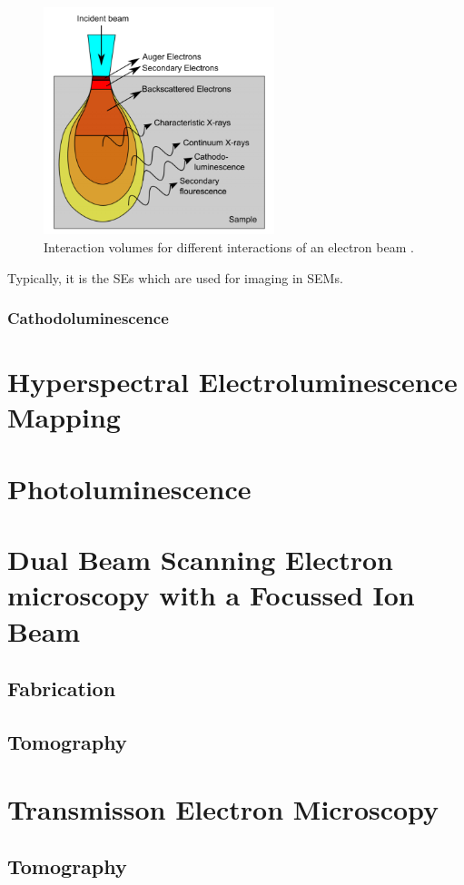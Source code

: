 \begin{figure}[h]
	\centering
	\includegraphics[width=0.6\textwidth]{Figs/Ch2/int.png}
	\caption {Interaction volumes for different interactions of an electron beam \cite{Puchtler2014}.}
	\label{2.5}
\end{figure}
\FloatBarrier

Typically, it is the SEs which are used for imaging in SEMs.
\subsubsection{Cathodoluminescence}


\section{Hyperspectral Electroluminescence Mapping}
\section{Photoluminescence}
\section{Dual Beam Scanning Electron microscopy with a Focussed Ion Beam}
\subsection{Fabrication}
\subsection{Tomography}
\section{Transmisson Electron Microscopy}
\subsection{Tomography}


